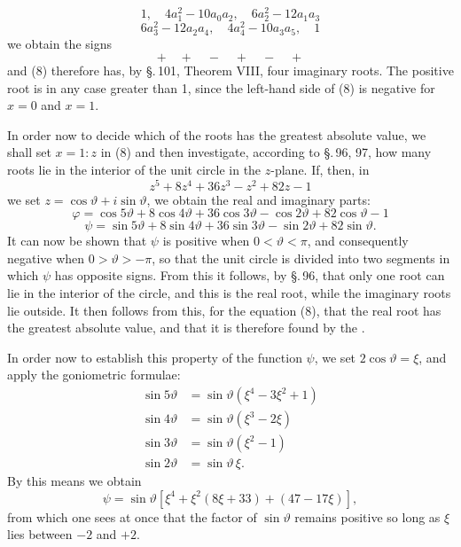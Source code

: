 \[
1, \quad 4a_1^2 - 10a_0a_2, \quad 6a_2^2 - 12a_1a_3
\]
\[
6a_3^2 - 12a_2a_4, \quad 4a_4^2 - 10a_3a_5, \quad 1
\]
we obtain the signs
\[
+ \quad + \quad - \quad + \quad - \quad +
\]
and (8) therefore has, by \S.\,101, Theorem VIII, four imaginary roots. The positive root is in any case greater than 1, since the left-hand side of (8) is negative for $x = 0$ and $x = 1$.

In order now to decide which of the roots has the greatest absolute value, we shall set $x = 1 : z$ in (8) and then investigate, according to \S.\,96, 97, how many roots lie in the interior of the unit circle in the $z$-plane. If, then, in
\[
z^5 + 8z^4 + 36z^3 - z^2 + 82z - 1
\]
we set $z = \cos\vartheta + i\sin\vartheta$, we obtain the real and imaginary parts:
\[
\varphi = \cos 5\vartheta + 8\cos 4\vartheta + 36\cos 3\vartheta - \cos 2\vartheta + 82\cos\vartheta - 1
\]
\[
\psi = \sin 5\vartheta + 8\sin 4\vartheta + 36\sin 3\vartheta - \sin 2\vartheta + 82\sin\vartheta.
\]
It can now be shown that $\psi$ is positive when $0 < \vartheta < \pi$, and consequently negative when $0 > \vartheta > -\pi$, so that the unit circle is divided into two segments in which $\psi$ has opposite signs. From this it follows, by \S.\,96, that only one root can lie in the interior of the circle, and this is the real root, while the imaginary roots lie outside. It then follows from this, for the equation (8), that the real root has the greatest absolute value, and that it is therefore found by the .

In order now to establish this property of the function $\psi$, we set $2\cos\vartheta = \xi$, and apply the goniometric formulae:
\[
\begin{aligned}
\sin 5\vartheta &= \sin\vartheta(\xi^4 - 3\xi^2 + 1) \\
\sin 4\vartheta &= \sin\vartheta(\xi^3 - 2\xi) \\
\sin 3\vartheta &= \sin\vartheta(\xi^2 - 1) \\
\sin 2\vartheta &= \sin\vartheta\,\xi.
\end{aligned}
\]
By this means we obtain
\[
\psi = \sin\vartheta[\xi^4 + \xi^2(8\xi + 33) + (47 - 17\xi)],
\]
from which one sees at once that the factor of $\sin\vartheta$ remains positive so long as $\xi$ lies between $-2$ and $+2$.
